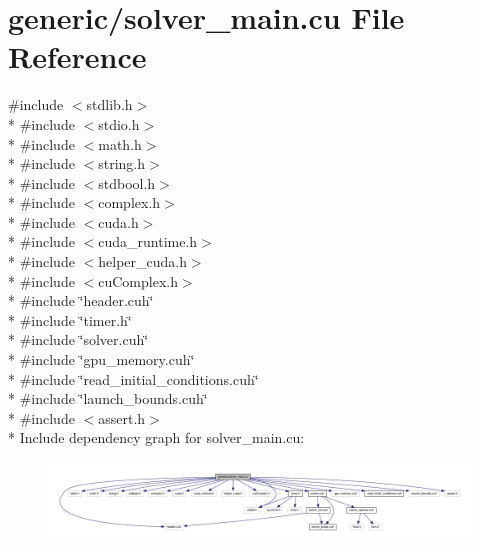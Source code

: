 \hypertarget{solver__main_8cu}{}\section{generic/solver\+\_\+main.cu File Reference}
\label{solver__main_8cu}
{\ttfamily \#include $<$stdlib.\+h$>$}\\*
{\ttfamily \#include $<$stdio.\+h$>$}\\*
{\ttfamily \#include $<$math.\+h$>$}\\*
{\ttfamily \#include $<$string.\+h$>$}\\*
{\ttfamily \#include $<$stdbool.\+h$>$}\\*
{\ttfamily \#include $<$complex.\+h$>$}\\*
{\ttfamily \#include $<$cuda.\+h$>$}\\*
{\ttfamily \#include $<$cuda\+\_\+runtime.\+h$>$}\\*
{\ttfamily \#include $<$helper\+\_\+cuda.\+h$>$}\\*
{\ttfamily \#include $<$cu\+Complex.\+h$>$}\\*
{\ttfamily \#include \char`\"{}header.\+cuh\char`\"{}}\\*
{\ttfamily \#include \char`\"{}timer.\+h\char`\"{}}\\*
{\ttfamily \#include \char`\"{}solver.\+cuh\char`\"{}}\\*
{\ttfamily \#include \char`\"{}gpu\+\_\+memory.\+cuh\char`\"{}}\\*
{\ttfamily \#include \char`\"{}read\+\_\+initial\+\_\+conditions.\+cuh\char`\"{}}\\*
{\ttfamily \#include \char`\"{}launch\+\_\+bounds.\+cuh\char`\"{}}\\*
{\ttfamily \#include $<$assert.\+h$>$}\\*
Include dependency graph for solver\+\_\+main.\+cu\+:\nopagebreak
\begin{figure}[H]
\begin{center}
\leavevmode
\includegraphics[width=350pt]{solver__main_8cu__incl}
\end{center}
\end{figure}
